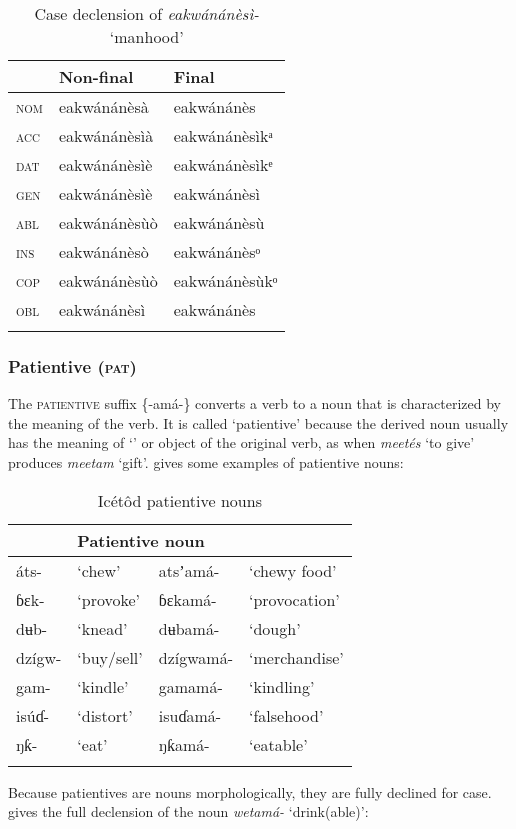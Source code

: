 \begin{table}
\caption{Case declension of \textit{eakwánánèsì-} ‘manhood’}
\label{tab:verbs:behave2}


\begin{tabularx}{.66\textwidth}{XXX}
\lsptoprule

& Non-final & Final\\
\midrule
\textsc{nom} & eakwánánèsà & eakwánánès\\
\textsc{acc} & eakwánánèsìà & eakwánánèsìkᵃ\\
\textsc{dat} & eakwánánèsìè & eakwánánèsìkᵉ\\
\textsc{gen} & eakwánánèsìè & eakwánánèsì\\
\textsc{abl} & eakwánánèsùò & eakwánánèsù\\
\textsc{ins} & eakwánánèsò & eakwánánèsᵒ\\
\textsc{cop} & eakwánánèsùò & eakwánánèsùkᵒ\\
\textsc{obl} & eakwánánèsì & eakwánánès\\
\lspbottomrule
\end{tabularx}
\end{table}

\subsubsection{Patientive (\textsc{pat})}\label{sec:8.3.3}

The \textsc{patientive} suffix \{-amá-\} converts a verb to a noun that is characterized by the meaning of the verb. It is called ‘patientive’ because the derived noun usually has the meaning of ‘’ or object of the original verb, as when \textit{meetés} ‘to give’ produces \textit{meetam} ‘gift’.  gives some examples of patientive nouns:


\begin{table}
\caption{Icétôd patientive nouns}
\label{tab:verbs:pat1}


\begin{tabularx}{\textwidth}{XXXX}
\lsptoprule

\multicolumn{2}{X}{Verb root} & \multicolumn{2}{X}{Patientive noun}\\
\midrule
áts- & ‘chew’ & atsʼamá- & ‘chewy food’\\
ɓɛk- & ‘provoke’ & ɓɛkamá- & ‘provocation’\\
dʉb- & ‘knead’ & dʉbamá- & ‘dough’\\
dzígw- & ‘buy/sell’ & dzígwamá- & ‘merchandise’\\
gam- & ‘kindle’ & gamamá- & ‘kindling’\\
isúɗ- & ‘distort’ & isuɗamá- & ‘falsehood’\\
ŋƙ- & ‘eat’ & ŋƙamá- & ‘eatable’\\
\lspbottomrule
\end{tabularx}
\end{table}
Because patientives are nouns morphologically, they are fully declined for case.  gives the full declension of the noun \textit{wetamá-} ‘drink(able)’:


